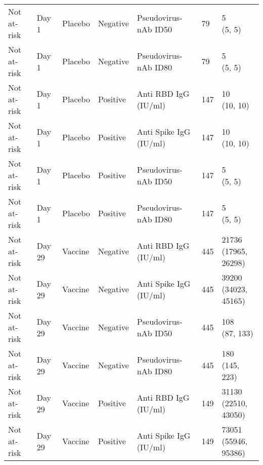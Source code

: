 \documentclass[]{book}
\theoremstyle{definition}
\theoremstyle{definition}
\theoremstyle{definition}
\newcommand{\1}{\mathbbm{1}}
\begin{document}
\begin{landscape}
\begin{ThreePartTable}
\begin{longtable}[t]{>{\raggedright\arraybackslash}p{7cm}llllll}
\hspace{1em}Not at-risk & Day 1 & Placebo & Negative & Pseudovirus-nAb ID50 & 79 & \makecell[l]{5\\(5, 5)}\\
\hspace{1em}Not at-risk & Day 1 & Placebo & Negative & Pseudovirus-nAb ID80 & 79 & \makecell[l]{5\\(5, 5)}\\
\hspace{1em}Not at-risk & Day 1 & Placebo & Positive & Anti RBD IgG (IU/ml) & 147 & \makecell[l]{10\\(10, 10)}\\
\hspace{1em}Not at-risk & Day 1 & Placebo & Positive & Anti Spike IgG (IU/ml) & 147 & \makecell[l]{10\\(10, 10)}\\
\hspace{1em}Not at-risk & Day 1 & Placebo & Positive & Pseudovirus-nAb ID50 & 147 & \makecell[l]{5\\(5, 5)}\\
\hspace{1em}Not at-risk & Day 1 & Placebo & Positive & Pseudovirus-nAb ID80 & 147 & \makecell[l]{5\\(5, 5)}\\
\hspace{1em}Not at-risk & Day 29 & Vaccine & Negative & Anti RBD IgG (IU/ml) & 445 & \makecell[l]{21736\\(17965, 26298)}\\
\hspace{1em}Not at-risk & Day 29 & Vaccine & Negative & Anti Spike IgG (IU/ml) & 445 & \makecell[l]{39200\\(34023, 45165)}\\
\hspace{1em}Not at-risk & Day 29 & Vaccine & Negative & Pseudovirus-nAb ID50 & 445 & \makecell[l]{108\\(87, 133)}\\
\hspace{1em}Not at-risk & Day 29 & Vaccine & Negative & Pseudovirus-nAb ID80 & 445 & \makecell[l]{180\\(145, 223)}\\
\hspace{1em}Not at-risk & Day 29 & Vaccine & Positive & Anti RBD IgG (IU/ml) & 149 & \makecell[l]{31130\\(22510, 43050)}\\
\hspace{1em}Not at-risk & Day 29 & Vaccine & Positive & Anti Spike IgG (IU/ml) & 149 & \makecell[l]{73051\\(55946, 95386)}\\

\end{longtable}
\end{ThreePartTable}
\end{landscape}
\end{document}

